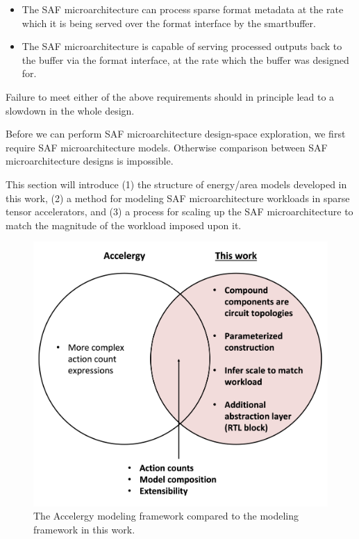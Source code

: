 \begin{itemize}
    \item The SAF microarchitecture can process sparse format metadata at the rate which it is being served over the format interface by the smartbuffer.
    \item The SAF microarchitecture is capable of serving processed outputs back to the buffer via the format interface, at the rate which the buffer was designed for.
\end{itemize}

Failure to meet either of the above requirements should in principle lead to a slowdown in the whole design.

Before we can perform SAF microarchitecture design-space exploration, we first require SAF microarchitecture models. Otherwise comparison between SAF microarchitecture designs is impossible.

This section will introduce (1) the structure of energy/area models developed in this work, (2) a method for modeling SAF microarchitecture workloads in sparse tensor accelerators, and (3) a process for scaling up the SAF microarchitecture to match the magnitude of the workload imposed upon it.

\begin{figure}[h]
\includegraphics[width=\textwidth]{figures/accelergy_comparison.png}
\caption{The Accelergy modeling framework compared to the modeling framework in this work.}
\label{fig:accelergy_comparison}
\end{figure}


